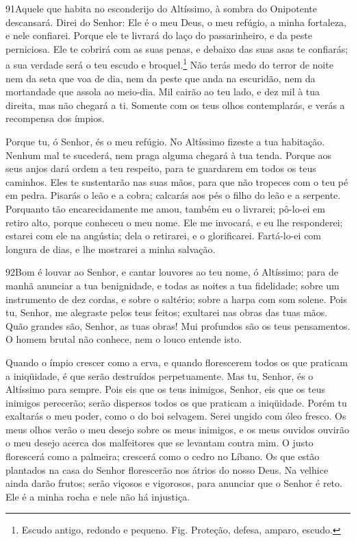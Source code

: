 \bigskip

\lettrine{91}{}Aquele que habita no esconderijo do Altíssimo, à
sombra do Onipotente descansará. Direi do Senhor: Ele é o meu
Deus, o meu refúgio, a minha fortaleza, e nele confiarei. Porque
ele te livrará do laço do passarinheiro, e da peste perniciosa.
Ele te cobrirá com as suas penas, e debaixo das suas asas te
confiarás; a sua verdade será o teu escudo e
broquel.\footnote{Escudo antigo, redondo e pequeno. Fig. Proteção,
defesa, amparo, escudo.} Não terás medo do terror de noite nem
da seta que voa de dia, nem da peste que anda na escuridão, nem
da mortandade que assola ao meio-dia. Mil cairão ao teu lado, e
dez mil à tua direita, mas não chegará a ti. Somente com os teus
olhos contemplarás, e verás a recompensa dos ímpios.

Porque tu, ó Senhor, és o meu refúgio. No Altíssimo fizeste a tua
habitação. Nenhum mal te sucederá, nem praga alguma chegará à
tua tenda. Porque aos seus anjos dará ordem a teu respeito,
para te guardarem em todos os teus caminhos. Eles te
sustentarão nas suas mãos, para que não tropeces com o teu pé em
pedra. Pisarás o leão e a cobra; calcarás aos pés o filho do
leão e a serpente. Porquanto tão encarecidamente me amou,
também eu o livrarei; pô-lo-ei em retiro alto, porque conheceu o meu
nome. Ele me invocará, e eu lhe responderei; estarei com ele
na angústia; dela o retirarei, e o glorificarei. Fartá-lo-ei
com longura de dias, e lhe mostrarei a minha salvação.

\bigskip

\lettrine{92}{}Bom é louvar ao Senhor, e cantar louvores ao teu
nome, ó Altíssimo; para de manhã anunciar a tua benignidade, e
todas as noites a tua fidelidade; sobre um instrumento de dez
cordas, e sobre o saltério; sobre a harpa com som solene. Pois
tu, Senhor, me alegraste pelos teus feitos; exultarei nas obras das
tuas mãos. Quão grandes são, Senhor, as tuas obras! Mui
profundos são os teus pensamentos. O homem brutal não conhece,
nem o louco entende isto.

Quando o ímpio crescer como a erva, e quando florescerem todos os
que praticam a iniqüidade, é que serão destruídos perpetuamente.
Mas tu, Senhor, és o Altíssimo para sempre. Pois eis que os
teus inimigos, Senhor, eis que os teus inimigos perecerão; serão
dispersos todos os que praticam a iniqüidade. Porém tu
exaltarás o meu poder, como o do boi selvagem. Serei ungido com óleo
fresco. Os meus olhos verão o meu desejo sobre os meus
inimigos, e os meus ouvidos ouvirão o meu desejo acerca dos
malfeitores que se levantam contra mim. O justo florescerá
como a palmeira; crescerá como o cedro no Líbano. Os que
estão plantados na casa do Senhor florescerão nos átrios do nosso
Deus. Na velhice ainda darão frutos; serão viçosos e
vigorosos, para anunciar que o Senhor é reto. Ele é a minha
rocha e nele não há injustiça.

